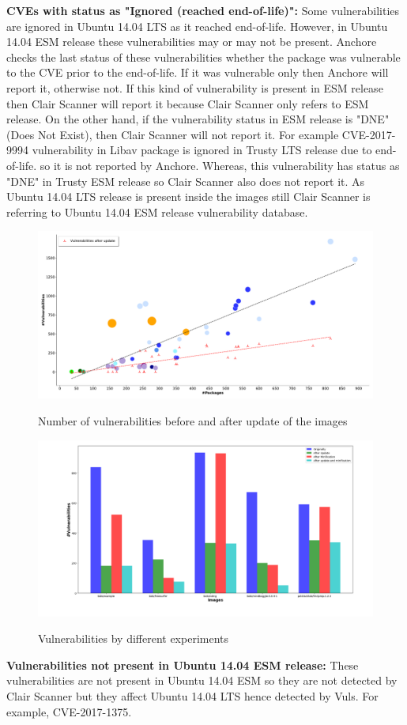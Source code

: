 \documentclass[a4paper,num-refs]{oup-contemporary}
\begin{document}
\textbf{CVEs with status as "Ignored (reached end-of-life)":}
Some vulnerabilities are ignored in Ubuntu 14.04 LTS as it reached end-of-life. 
However, in Ubuntu 14.04 ESM release these vulnerabilities may or may not be present.
Anchore checks the last status of these vulnerabilities whether the package was vulnerable to the CVE
prior to the end-of-life. If it was vulnerable only then Anchore will report it, otherwise not.
If this kind of vulnerability is present in ESM release then Clair Scanner will report it because Clair Scanner
only refers to ESM release. On the other hand, if the vulnerability
status in ESM release is "DNE" (Does Not Exist), then Clair Scanner will not report it. 
For example CVE-2017-9994 vulnerability in Libav package is ignored in Trusty LTS release due to end-of-life.
so it is not reported by Anchore. Whereas, this vulnerability has status as "DNE" in Trusty ESM
release so Clair Scanner also does not report it. As Ubuntu 14.04 LTS release is present inside the images still
Clair Scanner is referring to Ubuntu 14.04 ESM release vulnerability database.

\begin{figure}[!ht]
        {\includegraphics[width=\textwidth]
        {Figures/vulnwithupdate.pdf}}
        \caption{\label{fig:graph2} Number of vulnerabilities before and
        after update of the images}
      \end{figure}


\begin{figure}[!ht]
        {\includegraphics[scale=1.5,width=\textwidth]
        {Figures/bargraph.png}}
        \caption{\label{fig:bargraph} Vulnerabilities by different experiments}
      \end{figure}
\textbf{Vulnerabilities not present in Ubuntu 14.04 ESM release:} These vulnerabilities are not present in Ubuntu 14.04 ESM so they 
are not detected by Clair Scanner but they affect Ubuntu 14.04 LTS hence detected by Vuls. For example, CVE-2017-1375.
\end{document}
